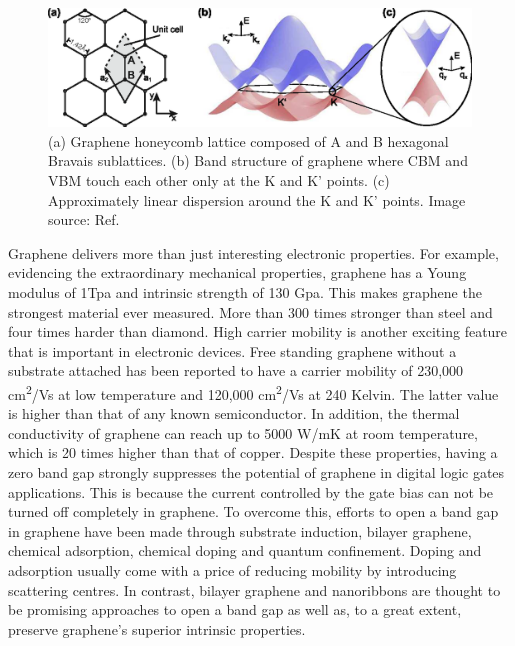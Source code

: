 \begin{figure}[htbp!] 
\centering  
\includegraphics[width=\textwidth]{gra_lat_band.eps}
\caption[Graphene lattice and band structure.]{(a) Graphene honeycomb lattice composed of A and B hexagonal Bravais sublattices. (b) Band structure of graphene where CBM and VBM touch each other only at the K and K' points. (c) Approximately linear dispersion around the K and K' points. Image source: Ref. \cite{Guttinger2012} }  
\label{fig:gra_band}
\end{figure} 

Graphene delivers more than just interesting electronic properties. For example, evidencing the extraordinary mechanical properties, graphene has a Young modulus of 1Tpa and intrinsic strength of 130 Gpa\cite{Lee385}. This makes graphene the strongest material ever measured. More than 300 times stronger than steel and four times harder than diamond. High carrier mobility is another exciting feature that is important in electronic devices. Free standing graphene without a substrate attached has been reported to have a carrier mobility of 230,000 \si{cm^2/Vs} at low temperature\cite{Bolotin2008a} and 120,000 \si{cm^2/Vs} at 240 Kelvin. The latter value is higher than that of any known semiconductor\cite{Bolotin2008b}. In addition, the thermal conductivity of graphene can reach up to 5000 \si{W/mK} at room temperature, which is 20 times higher than that of copper\cite{Alexander2008}. Despite these properties, having a zero band gap strongly suppresses the potential of graphene in digital logic gates applications. This is because the current controlled by the gate bias can not be turned off completely in graphene. To overcome this, efforts to open a band gap in graphene have been made through substrate induction\cite{Ci2010,zhou2007}, bilayer graphene\cite{mccann2006,castro2007}, chemical adsorption\cite{Elias2009,Jeon2011}, chemical doping\cite{zhou2008} and quantum confinement\cite{Nakada1996,Barone2006}.  Doping and adsorption usually come with a price of reducing mobility by introducing scattering centres. In contrast, bilayer graphene and nanoribbons are thought to be promising approaches to open a band gap as well as, to a great extent, preserve graphene's superior intrinsic properties.

